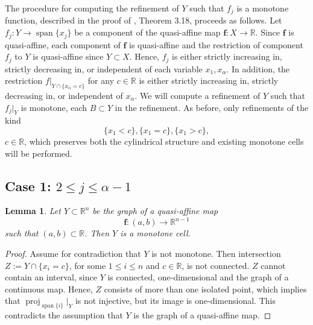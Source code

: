 \documentclass[
]{book}
\newtheorem{lemma}{Lemma}[chapter]
\theoremstyle{definition}
\theoremstyle{definition}
\theoremstyle{definition}
\theoremstyle{definition}
\theoremstyle{remark}
\begin{document}
The procedure for computing the refinement of \(Y\) such that \(f_j\) is a monotone function, described in the proof of \citet{bgv15}, Theorem 3.18, proceeds as follows.
Let \(f_j : Y \to {\operatorname{span} \{x_j\}}\) be a component of the quasi-affine map \(\mathbf{f} : X \to \mathbb{R}\). Since \(\mathbf{f}\) is quasi-affine, each component of \(\mathbf{f}\) is quasi-affine and the restriction of component \(f_j\) to \(Y\) is quasi-affine since \(Y \subset X\).
Hence, \(f_j\) is either strictly increasing in, strictly decreasing in, or independent of each variable \(x_1, x_\alpha\).
In addition, the restriction \(f\vert_{Y \cap \{x_\alpha = c\}}\) for any \(c \in \mathbb{R}\) is either strictly increasing in, strictly decreasing in, or independent of \(x_\alpha\).
We will compute a refinement of \(Y\) such that \(f_j\vert_Y\) is monotone, each \(B \subset Y\) in the refinement.
As before, only refinements of the kind
\[
\{ x_1 < c \}, \{ x_1 = c \}, \{ x_1 > c \},
\]
\(c \in \mathbb{R}\), which preserves both the cylindrical structure and existing monotone cells will be performed.

\hypertarget{case-1-2-le-j-le-alpha---1}{%
\subsection{\texorpdfstring{Case 1: \(2 \le j \le \alpha - 1\)}{Case 1: 2 \textbackslash le j \textbackslash le \textbackslash alpha - 1}}\label{case-1-2-le-j-le-alpha---1}}

\begin{lemma}
\protect\hypertarget{lem:one-dim-qa-is-monotone}{}\label{lem:one-dim-qa-is-monotone}Let \(Y \subset \mathbb{R}^n\) be the graph of a quasi-affine map
\[
\mathbf{f} : (a,b) \to \mathbb{R}^{n-1}
\]
such that \((a,b) \subset \mathbb{R}\). Then \(Y\) is a monotone cell.
\end{lemma}

\begin{proof}
Assume for contradiction that \(Y\) is not monotone. Then intersection \(Z := Y \cap \{ x_i = c \}\), for some \(1\le i \le n\) and \(c \in \mathbb{R}\), is not connected.
\(Z\) cannot contain an interval, since \(Y\) is connected, one-dimensional and the graph of a continuous map.
Hence, \(Z\) consists of more than one isolated point, which implies that \({\operatorname{proj}_{{\operatorname{span} \{i\}}}}\vert_Y\) is not injective, but its image is one-dimensional.
This contradicts the assumption that \(Y\) is the graph of a quasi-affine map.
\end{proof}
\end{document}
